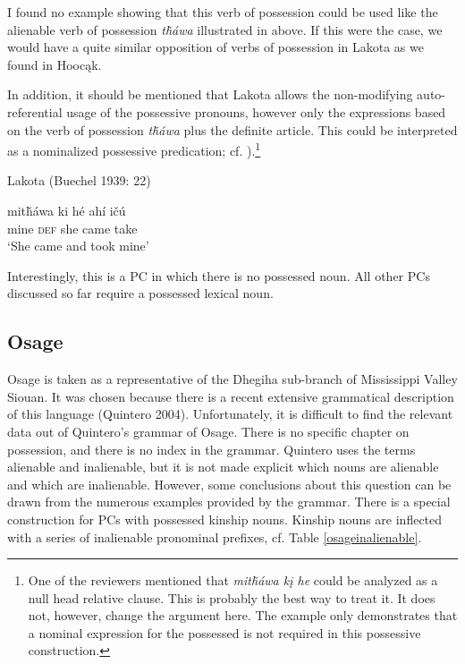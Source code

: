 \documentclass[output=paper]{LSP/langsci}
\begin{document}
I found no example showing that this verb of possession could be used like the alienable verb of possession \textit{t\v{h}\'awa} illustrated in  above. If this were the case, we would have a quite similar opposition of verbs of possession in Lakota as we found in Hoocąk. 

In addition, it should be mentioned that Lakota allows the non-modifying auto-referential usage of the possessive pronouns, however only the expressions based on the verb of possession \textit{t\v{h}\'awa} plus the definite article. This could be interpreted as a nominalized possessive predication; cf. ).\footnote{One of the reviewers mentioned that \textit{mit\v{h}áwa kį he} could be analyzed as a null head relative clause. This is probably the best way to treat it. It does not, however, change the argument here. The example only demonstrates that a nominal expression for the possessed is not required in this possessive construction.}

\ea	Lakota (Buechel 1939: 22) \label{lakotatookmine}

\gll mit\v{h}áwa ki      h\'e   ahí     i\v{c}ú \\
mine        \textsc{def} she came take \\
\glt `She came and took mine'
\z

Interestingly, this is a PC in which there is no possessed noun. All other PCs discussed so far require a possessed lexical noun.

\subsection{Osage}
Osage is taken as a representative of the Dhegiha sub-branch of Mississippi Valley Siouan. It was chosen because there is a recent extensive grammatical description of this language (Quintero 2004). Unfortunately, it is difficult to find the relevant data out of Quintero's grammar of Osage. There is no specific chapter on possession, and there is no index in the grammar. Quintero uses the terms alienable and inalienable, but it is not made explicit which nouns are alienable and which are inalienable. However, some conclusions about this question can be drawn from the numerous examples provided by the grammar.
There is a special construction for PCs with possessed kinship nouns. Kinship nouns are inflected with a series of inalienable pronominal prefixes, cf. Table \ref{osageinalienable}.
\end{document}
